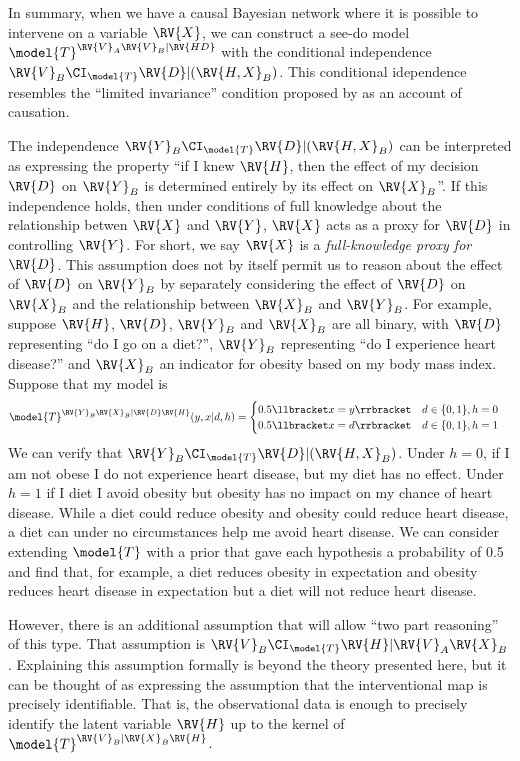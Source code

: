 
In summary, when we have a causal Bayesian network where it is possible to intervene on a variable $\RV{X}$, we can construct a see-do model $\model{T}^{\RV{V}_{A}\RV{V}_B|\RV{HD}}$ with the conditional independence $\RV{V}_{B}\CI_{\model{T}} \RV{D}|(\RV{H,X}_B)$. This conditional idependence resembles the ``limited invariance'' condition proposed by  as an account of causation. 

The independence $\RV{Y}_{B}\CI_{\model{T}} \RV{D}|(\RV{H,X}_B)$ can be interpreted as expressing the property ``if I knew $\RV{H}$, then the effect of my decision $\RV{D}$ on $\RV{Y}_B$ is determined entirely by its effect on $\RV{X}_B$''. If this independence holds, then under conditions of full knowledge about the relationship betwen $\RV{X}$ and $\RV{Y}$, $\RV{X}$ acts as a proxy for $\RV{D}$ in controlling $\RV{Y}$. For short, we say $\RV{X}$ is a \emph{full-knowledge proxy for }$\RV{D}$. This assumption does not by itself permit us to reason about the effect of $\RV{D}$ on $\RV{Y}_B$ by separately considering the effect of $\RV{D}$ on $\RV{X}_B$ and the relationship between $\RV{X}_B$ and $\RV{Y}_B$. For example, suppose $\RV{H}$, $\RV{D}$, $\RV{Y}_B$ and $\RV{X}_B$ are all binary, with $\RV{D}$ representing ``do I go on a diet?'', $\RV{Y}_B$ representing ``do I experience heart disease?'' and $\RV{X}_B$ an indicator for obesity based on my body mass index. Suppose that my model is
\begin{align}
    \model{T}^{\RV{Y}_B\RV{X}_B|\RV{D}\RV{H}}(y,x|d,h) &= \begin{cases}
        0.5\llbracket x=y\rrbracket & d\in\{0,1\},h=0\\
        0.5\llbracket x = d \rrbracket & d\in \{0,1\},h=1
    \end{cases}
\end{align}
We can verify that $\RV{Y}_{B}\CI_{\model{T}} \RV{D}|(\RV{H,X}_B)$. Under $h=0$, if I am not obese I do not experience heart disease, but my diet has no effect. Under $h=1$ if I diet I avoid obesity but obesity has no impact on my chance of heart disease. While a diet could reduce obesity and obesity could reduce heart disease, a diet can under no circumstances help me avoid heart disease. We can consider extending $\model{T}$ with a prior that gave each hypothesis a probability of 0.5 and find that, for example, a diet reduces obesity in expectation and obesity reduces heart disease in expectation but a diet will not reduce heart disease.

However, there is an additional assumption that will allow ``two part reasoning'' of this type. That assumption is $\RV{V}_B\CI_{\model{T}}\RV{H}|\RV{V}_A\RV{X}_B$. Explaining this assumption formally is beyond the theory presented here, but it can be thought of as expressing the assumption that the interventional map is precisely identifiable. That is, the observational data is enough to precisely identify the latent variable $\RV{H}$ up to the kernel of $\model{T}^{\RV{V}_B|\RV{X}_B\RV{H}}$.

